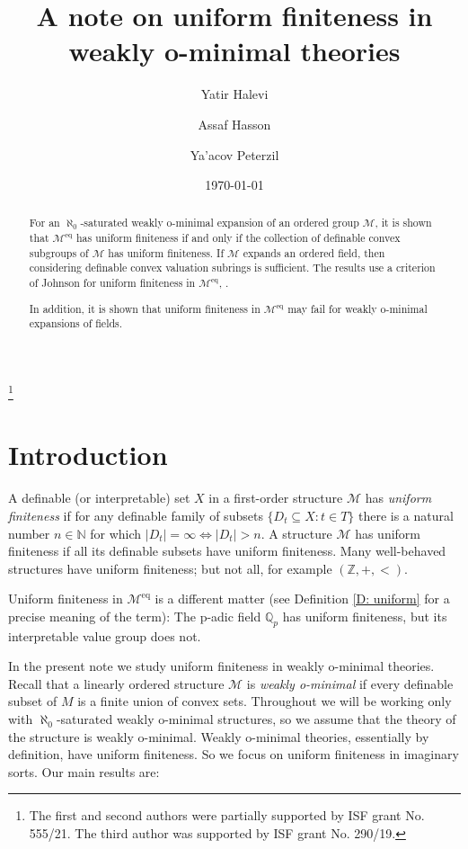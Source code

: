 \documentclass[11pt]{amsart}
\title{A note on uniform finiteness in weakly o-minimal theories}
\author{Yatir Halevi}
\author{Assaf Hasson}
\author{Ya'acov Peterzil}
\date{\today}
\DeclareMathOperator{\eq}{eq}
\theoremstyle{definition}
\newcommand{\CK}{{\mathcal K}}
\newcommand{\CM}{{\mathcal M}}
\newcommand{\0}{\emptyset}
\begin{document}
 \thanks{The first and second authors were partially supported by ISF grant No. 555/21. The third author was supported by ISF grant No. 290/19.}
    
	\maketitle
     \begin{abstract}
         For an $\aleph_0$-saturated weakly o-minimal expansion of an ordered group $\CM$, it is shown that $\CM^{\eq}$ has uniform finiteness if and only if the collection of definable convex subgroups of $\CM$ has uniform finiteness. If $\CM$ expands an ordered field, then considering definable convex valuation subrings is sufficient. The results use a criterion of Johnson for uniform finiteness in $\CM^{\eq}$, \cite{JohnUF}.
        
        
        In addition, it is shown that uniform finiteness in $\CM^{\eq}$ may fail for weakly o-minimal expansions of fields.


     \end{abstract}
    \section{Introduction}

A definable (or interpretable) set $X$ in a first-order structure $\CM$ has \emph{uniform finiteness} if for any definable family of subsets $\{D_t\subseteq X: t\in T\}$ there is a natural number $n\in \mathbb{N}$ for which $|D_t|=\infty\iff |D_t|>n$. A structure $\CM$ has uniform finiteness if all its definable subsets have uniform finiteness.  Many well-behaved structures have uniform finiteness; but not all, for example $(\mathbb{Z},+,<)$.

Uniform finiteness in $\CM^{\eq}$ is a different matter (see Definition \ref{D: uniform} for a precise meaning of the term): The p-adic field $\mathbb{Q}_p$ has uniform finiteness, but its interpretable value group does not.

In the present note we study uniform finiteness in weakly o-minimal theories. Recall that a linearly ordered structure $\CM$ is \textit{weakly o-minimal } if every definable subset of $M$ is a finite union of convex sets. Throughout we will be working only with $\aleph_0$-saturated weakly o-minimal structures, so we assume that the theory  of the structure is  weakly o-minimal. Weakly o-minimal theories, essentially by definition, have uniform finiteness. So we focus on uniform  finiteness in imaginary sorts. Our main results are: 
\end{document}
